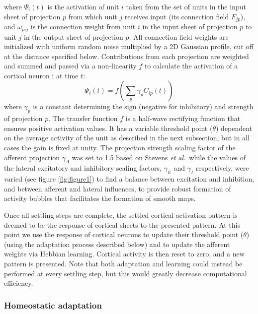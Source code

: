 \documentclass[utf8]{frontiersSCNS}
\newcommand{\etal}{\textit{et al.}}
\begin{document}
\noindent where $\Psi_{i}(t)$ is the activation of unit $i$ taken from the set of units in the input
sheet of projection $p$ from which unit $j$ receives input (its connection field $F_{jp}$), and $\omega_{pij}$ is the connection
weight from unit $i$ in the input sheet of projection $p$ to unit $j$ in the output sheet of projection $p$. All connection field
weights are initialized with uniform random noise multiplied by a 2D Gaussian profile, cut off at the distance specified below.
Contributions from each projection are weighted and summed and passed via a non-linearity $f$ to calculate the activation of a cortical neuron i at time $t$:
\begin{equation} \label{eq:neural_model}
\Psi_{i}(t)= f(\sum_{p}\gamma_{p}C_{ip}(t))
\end{equation}
\noindent where $\gamma_{p}$ is a constant determining the sign (negative for inhibitory) and strength of projection $p$. 
The transfer function $f$ is a half-wave rectifying function that ensures positive activation values. It has a 
variable threshold point ($\theta$) dependent on the average activity of the unit as described in the next subsection, 
but in all cases the gain is fixed at unity. The projection strength scaling factor of the afferent projection $\gamma_{A}$ was set to 1.5 
based on Stevens \etal\,\citep{Stevens2013} while the values of the lateral excitatory and inhibitory scaling factors, $\gamma_{E}$
and $\gamma_{I}$ respectively, were varied (see figure \ref{fig:figure1}) to find a balance between excitation and inhibition, and between afferent and lateral influences, to provide robust formation of activity bubbles that facilitates the formation of smooth maps.

Once all  settling steps are complete, the settled cortical activation pattern is deemed to be the response of cortical sheets to 
the presented pattern. At this point we use the response of cortical neurons to update their threshold point ($\theta$) (using the adaptation process described below) and to update the afferent weights via Hebbian learning. Cortical activity is then reset to zero, and a new pattern is presented. Note that both adaptation and learning could instead be performed at every settling step, but this would greatly decrease computational efficiency.

\subsubsection{Homeostatic adaptation}
\end{document}
